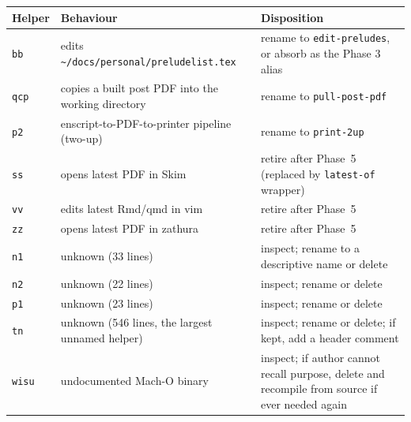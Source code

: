 \documentclass[11pt,letterpaper]{scrartcl}
\begin{document}
\begin{longtable}{@{}llp{2.5in}@{}}
  \toprule
  \textbf{Helper} & \textbf{Behaviour} & \textbf{Disposition} \\
  \midrule
  \texttt{bb}    & edits \texttt{\textasciitilde/docs/personal/preludelist.tex} & rename to \texttt{edit-preludes}, or absorb as the Phase 3 alias \\
  \texttt{qcp}   & copies a built post PDF into the working directory          & rename to \texttt{pull-post-pdf}                                  \\
  \texttt{p2}    & enscript-to-PDF-to-printer pipeline (two-up)                 & rename to \texttt{print-2up}                                      \\
  \texttt{ss}    & opens latest PDF in Skim                                     & retire after Phase~5 (replaced by \texttt{latest-of} wrapper)     \\
  \texttt{vv}    & edits latest Rmd/qmd in vim                                  & retire after Phase~5                                              \\
  \texttt{zz}    & opens latest PDF in zathura                                  & retire after Phase~5                                              \\
  \texttt{n1}    & unknown (33 lines)                                           & inspect; rename to a descriptive name or delete                   \\
  \texttt{n2}    & unknown (22 lines)                                           & inspect; rename or delete                                         \\
  \texttt{p1}    & unknown (23 lines)                                           & inspect; rename or delete                                         \\
  \texttt{tn}    & unknown (546 lines, the largest unnamed helper)              & inspect; rename or delete; if kept, add a header comment         \\
  \texttt{wisu}  & undocumented Mach-O binary                                   & inspect; if author cannot recall purpose, delete and recompile from source if ever needed again \\
  \bottomrule
\end{longtable}
\end{document}
